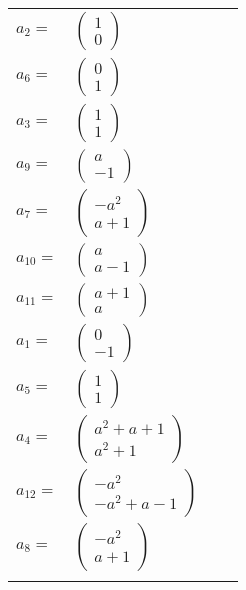 \documentclass[1p]{elsarticle_modified}
\theoremstyle{definition}
\begin{document}
\begin{tabular}{m{7pt} m{180pt} m{7pt} m{180pt} }
\flushright $a_{2}=$&$\begin{pmatrix}1\\0\end{pmatrix}$ \\
\flushright $a_{6}=$&$\begin{pmatrix}0\\1\end{pmatrix}$ \\
\flushright $a_{3}=$&$\begin{pmatrix}1\\1\end{pmatrix}$ \\
\flushright $a_{9}=$&$\begin{pmatrix}a\\-1\end{pmatrix}$ \\
\flushright $a_{7}=$&$\begin{pmatrix}- a^2\\a+1\end{pmatrix}$ \\
\flushright $a_{10}=$&$\begin{pmatrix}a\\a-1\end{pmatrix}$ \\
\flushright $a_{11}=$&$\begin{pmatrix}a+1\\a\end{pmatrix}$ \\
\flushright $a_{1}=$&$\begin{pmatrix}0\\-1\end{pmatrix}$ \\
\flushright $a_{5}=$&$\begin{pmatrix}1\\1\end{pmatrix}$ \\
\flushright $a_{4}=$&$\begin{pmatrix}a^2+a+1\\a^2+1\end{pmatrix}$ \\
\flushright $a_{12}=$&$\begin{pmatrix}- a^2\\- a^2+a-1\end{pmatrix}$ \\
\flushright $a_{8}=$&$\begin{pmatrix}- a^2\\a+1\end{pmatrix}$\\&\end{tabular}
\end{document}
